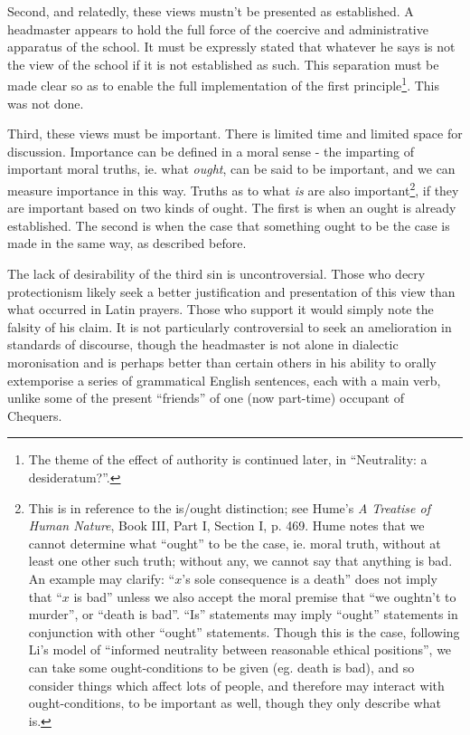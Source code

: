 \documentclass[12pt,a4paper]{report}
\begin{document}
\begin{multicols}{2}
Second, and relatedly, these views mustn't be presented as established.
A headmaster appears to hold the full force of the coercive and
administrative apparatus of the school. It must be expressly stated that
whatever he says is not the view of the school if it is not established
as such. This separation must be made clear so as to enable the full
implementation of the first principle\footnote{The theme of the effect
	of authority is continued later, in ``Neutrality: a desideratum?''.}.
This was not done.

Third, these views must be important. There is limited time and limited
space for discussion. Importance can be defined in a moral sense - the
imparting of important moral truths, ie. what \textit{ought}, can be said
to be important, and we can measure importance in this way. Truths as to
what \textit{is} are also important\footnote{This is in reference to the
	is/ought distinction; see Hume's \textit{A Treatise of Human Nature},
	Book III, Part I, Section I, p. 469. Hume notes that we cannot
	determine what ``ought'' to be the case, ie. moral truth, without at
	least one other such truth; without any, we cannot say that anything
	is bad. An example may clarify: ``$x$'s sole consequence is a
	death'' does not imply that ``$x$ is bad'' unless we also accept
	the moral premise that ``we oughtn't to murder'', or ``death is bad''.
	``Is'' statements may imply ``ought'' statements in conjunction with
	other ``ought'' statements. Though this is the case, following Li's
	model of ``informed neutrality between reasonable ethical positions'',
	we can take some ought-conditions to be given (eg. death is bad), and
	so consider things which affect lots of people, and therefore may
	interact with ought-conditions, to be important as well, though they
	only describe what is.}, if they are important based on two kinds of
ought. The first is when an ought is already established. The second is
when the case that something ought to be the case is made in the same
way, as described before.

The lack of desirability of the third sin is uncontroversial. Those who
decry protectionism likely seek a better justification and presentation
of this view than what occurred in Latin prayers. Those who support it
would simply note the falsity of his claim. It is not particularly
controversial to seek an amelioration in standards of discourse, though
the headmaster is not alone in dialectic moronisation and is perhaps
better than certain others in his ability to orally extemporise a series
of grammatical English sentences, each with a main verb, unlike some of
the present ``friends'' of one (now part-time) occupant of Chequers.


\end{multicols}
\end{document}
